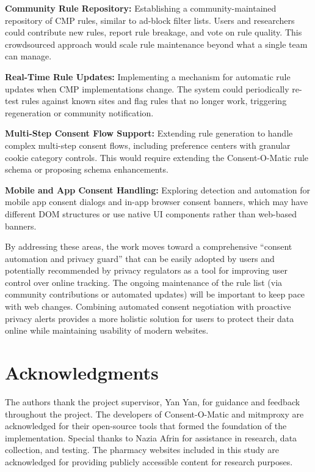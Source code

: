 \documentclass[conference]{IEEEtran}
\begin{document}
\textbf{Community Rule Repository:} Establishing a community-maintained repository of CMP rules, similar to ad-block filter lists. Users and researchers could contribute new rules, report rule breakage, and vote on rule quality. This crowdsourced approach would scale rule maintenance beyond what a single team can manage.

\textbf{Real-Time Rule Updates:} Implementing a mechanism for automatic rule updates when CMP implementations change. The system could periodically re-test rules against known sites and flag rules that no longer work, triggering regeneration or community notification.

\textbf{Multi-Step Consent Flow Support:} Extending rule generation to handle complex multi-step consent flows, including preference centers with granular cookie category controls. This would require extending the Consent-O-Matic rule schema or proposing schema enhancements.

\textbf{Mobile and App Consent Handling:} Exploring detection and automation for mobile app consent dialogs and in-app browser consent banners, which may have different DOM structures or use native UI components rather than web-based banners.

By addressing these areas, the work moves toward a comprehensive ``consent automation and privacy guard'' that can be easily adopted by users and potentially recommended by privacy regulators as a tool for improving user control over online tracking. The ongoing maintenance of the rule list (via community contributions or automated updates) will be important to keep pace with web changes. Combining automated consent negotiation with proactive privacy alerts provides a more holistic solution for users to protect their data online while maintaining usability of modern websites.

\section*{Acknowledgments}

The authors thank the project supervisor, Yan Yan, for guidance and feedback throughout the project. The developers of Consent-O-Matic and mitmproxy are acknowledged for their open-source tools that formed the foundation of the implementation. Special thanks to Nazia Afrin for assistance in research, data collection, and testing. The pharmacy websites included in this study are acknowledged for providing publicly accessible content for research purposes.
\end{document}

